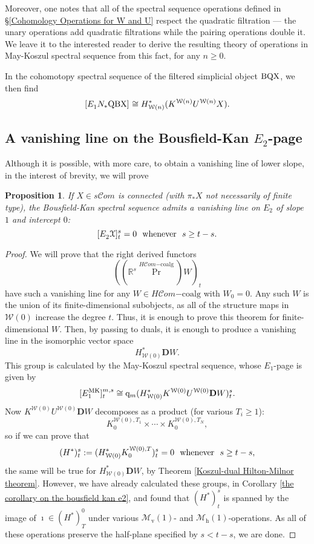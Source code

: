 \documentclass[11pt]{amsart} \renewcommand{\baselinestretch}{1.2}
\theoremstyle{plain}
\newtheorem{prop}[thm]{Proposition}
\theoremstyle{definition}
\DeclareMathOperator{\Prim}{Pr}
\newcommand{\scrC}{\mathscr{C}}
\newcommand{\calX}{\mathcal{X}}
\newcommand{\calw}{\mathcal{W}}
\newcommand{\calx}{\mathcal{X}}
\newcommand{\calMv}{\mathcal{M}\dver}
\newcommand{\calMh}{\mathcal{M}\dhor}
\newcommand{\HC}[1]{H#1\mathrm{-coalg}}
\newcommand{\quadgrad}[1]{\mathrm{q}_{#1}}
\newcommand{\algs}{{\scrC\!\textit{om}}}
\newcommand{\E}[5]{[E^{#1}_{#2}#3]^{#4}_{#5}}
\newcommand{\dver}{_\mathrm{v}}
\newcommand{\dhor}{_\mathrm{h}}
\newcommand{\dual}{\mathbf{D}}
\begin{document}
\begin{May sseq and vanishing line}
Moreover, one notes that all of the spectral sequence operations defined in \S\ref{Cohomology Operations for W and U} respect the quadratic filtration --- the unary operations add quadratic filtrations while the pairing operations double it. We leave it to the interested reader to derive the resulting theory of operations in May-Koszul spectral sequence from this fact, for any $n\geq0$.

In the cohomotopy spectral sequence of the filtered simplicial object $\textup{BQX}$, we then find
\[\E{}{1}{N_*\textup{QBX}}{}{}\cong H^*_{\calw(n)}(K^{\calw(n)}U^{\calw(n)}X).\]

\subsection{A vanishing line on the Bousfield-Kan $E_2$-page}
\label{A vanishing line on the Bousfield-Kan}
Although it is possible, with more care, to obtain a vanishing line of lower slope, in the interest of brevity, we will prove
\begin{prop}
If $X\in s\algs$ is connected (with $\pi_*X$ not necessarily of finite type), the Bousfield-Kan spectral sequence admits a vanishing line on $E_2$ of slope $1$ and intercept $0$:
\[\E{}{2}{\calx}{s}{t}=0\textup{ \ whenever \ }s\geq t-s.\]
\end{prop}
\begin{proof}
We will prove that the right derived functors
\[((\mathbb{R}^s\Prim^{\HC{\algs}})W)_t\]
have such a vanishing line for any $W\in \HC{\algs}$ with $W_0=0$. Any such $W$ is the union of its finite-dimensional subobjects, as all of the structure maps in $\calw(0)$ increase the degree $t$. Thus, it is enough to prove this theorem for finite-dimensional $W$. Then, by passing to duals, it is enough to produce a vanishing line in the isomorphic vector space
\[H^*_{\calw(0)}\dual W.\]
This group is calculated by the May-Koszul spectral sequence, whose $E_1$-page is given by
\[\E{\textup{MK}}{1}{}{m,s}{t}\cong \quadgrad{m}(H^*_{\calw(0)}K^{\calw(0)}U^{\calw(0)}\dual W)^{s}_{t}.\]
Now $K^{\calw(0)}U^{\calw(0)}\dual W$ decomposes as a product (for various $T_i\geq1$):
\[K_{0}^{\calw(0),T_1}\times\cdots \times K_{0}^{\calw(0),T_N},\]
so if we can prove that
\[(H^*)^s_t:=(H^{*}_{\calw(0)}K_0^{\calw(0),T})^s_t=0 \textup{ \ whenever \ }s\geq t-s,\]
the same will be true for $H^*_{\calw(0)}\dual W$, by Theorem \ref{Koszul-dual Hilton-Milnor theorem}. %
However, we have already calculated these groups, in Corollary \ref{the corollary on the bousfield kan e2}, and found that $(H^*)^s_t$ is spanned by the image of $\imath\in (H^*)^0_T$ under various $\calMv(1)$- and $\calMh(1)$-operations. As all of these operations preserve the half-plane specified by $s<t-s$, we are done.
\end{proof}


\end{May sseq and vanishing line}
\end{document}
